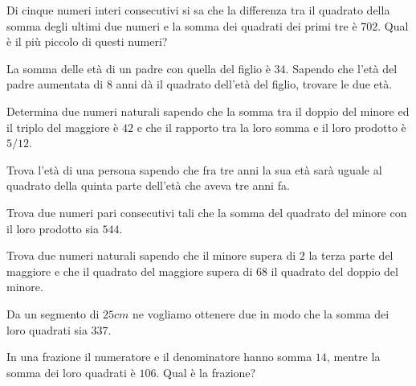 \begin{multicols}{2}
\begin{esercizio}[\Ast]
 \label{ese:3.120}
Di cinque numeri interi consecutivi si sa che la differenza tra il quadrato
della somma degli ultimi due numeri e la somma dei quadrati dei primi tre è
$ 702 $. Qual è il più piccolo di questi numeri?
\end{esercizio}

 \begin{esercizio}[\Ast]
 \label{ese:3.121}
La somma delle età di un padre con quella del figlio è $ 34 $. Sapendo che
l'età del padre aumentata di $ 8 $ anni dà il quadrato dell'età del figlio,
trovare le due età.
\end{esercizio}

\begin{esercizio}[\Ast]
 \label{ese:3.122}
Determina due numeri naturali sapendo che la somma tra il doppio del minore
ed il triplo del maggiore è $ 42 $ e che il rapporto tra la loro somma e il loro
prodotto è $ 5/12 $.
\end{esercizio}

\begin{esercizio}[\Ast]
 \label{ese:3.123}
Trova l'età di una persona sapendo che fra tre anni la sua età sarà
uguale al quadrato della quinta parte dell'età che aveva tre anni fa.
\end{esercizio}

\begin{esercizio}[\Ast]
 \label{ese:3.124}
Trova due numeri pari consecutivi tali che la somma del quadrato del minore
con il loro prodotto sia $ 544 $.
\end{esercizio}

\begin{esercizio}[\Ast]
 \label{ese:3.125}
Trova due numeri naturali sapendo che il minore supera di $ 2 $ la terza parte
del maggiore e che il quadrato del maggiore supera di $ 68 $ il quadrato del
doppio del minore.
\end{esercizio}

\begin{esercizio}[\Ast]
 \label{ese:3.126}
Da un segmento di $ 25\unit{cm} $ ne vogliamo ottenere due in modo che la somma dei
loro quadrati sia $ 337 $.
\end{esercizio}

\begin{esercizio}[\Ast]
 \label{ese:3.127}
In una frazione il numeratore e il denominatore hanno somma $ 14 $, mentre la
somma dei loro quadrati è $ 106 $. Qual è la frazione?
\end{esercizio}


\end{multicols}
